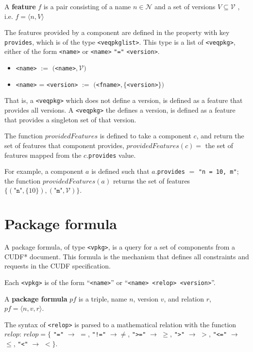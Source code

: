 \begin{defs}
A \textbf{feature} $f$ is a pair consisting of a name $n \in \mathcal{N}$ and a set of versions $V \subseteq \mathcal{V}$ , 
i.e. $f = \langle n,V \rangle$
\end{defs}

The features provided by a component are defined in the property with key \verb+provides+, which is of the type \texttt{<veqpkglist>}.
This type is a list of \texttt{<veqpkg>}, either of the form \verb+<name>+ or  \verb+<name>+ \texttt{"="} \verb+<version>+.
\begin{itemize}
  \item \verb+<name>+ $:=$ $($\verb+<name>+$,\mathcal{V})$
  \item \verb+<name>+ = \verb+<version>+ $:=$ $($\verb+<fname>+$,\{$\verb+<version>+$\})$
\end{itemize}
That is, a \texttt{<veqpkg>} which does not define a version, is defined as a feature that provides all versions.
A  \texttt{<veqpkg>} the defines a version, is defined as a feature that provides a singleton set of that version.

\begin{defs}
The function $providedFeatures$ is defined to take a component $c$, and return the set of features that component provides,
$providedFeatures(c) =$ the set of features mapped from the $c$.\texttt{provides} value.
\end{defs}

For example, a component $a$ is defined such that $a.$\texttt{provides} $=$ \texttt{"n = 10, m"};
the function $providedFeatures(a)$ returns the set of features $\{( \texttt{"n"},\{10\} ), ( \texttt{"m"},\mathcal{V})\}$.

\section{Package formula}
A package formula, of type \texttt{<vpkg>}, is a query for a set of components from a CUDF* document.
This formula is the mechanism that defines all constraints and requests in the CUDF specification.

Each \texttt{<vpkg>} is of the form ``\texttt{<name>}'' or  ``\texttt{<name> <relop> <version>}''.
\begin{defs}
A \textbf{package formula} $pf$ is a triple, name $n$, version $v$, and relation $r$, $pf = \langle n, v , r \rangle$.
\end{defs}

The syntax of \verb+<relop>+ is parsed to a mathematical relation with the function $relop$:  
$relop = \{$ \verb+"="+ $\rightarrow$ $=$, \verb+"!="+ $\rightarrow \not =$, 
\verb+">="+ $\rightarrow$ $\geq$, \verb+">"+ $\rightarrow$ $>$, \verb+"<="+ $\rightarrow$ $\leq$, \verb+"<"+ $\rightarrow$ $<$$\}$.

